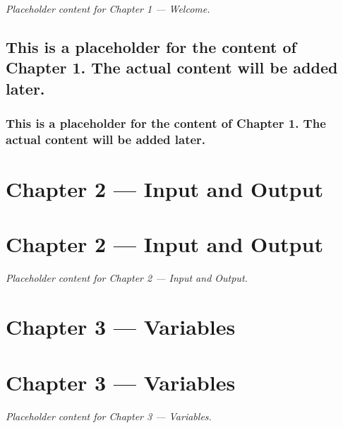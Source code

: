 \documentclass[
  letterpaper,
  DIV=11,
  numbers=noendperiod]{scrreprt}
\begin{document}

\emph{Placeholder content for Chapter 1 --- Welcome.}

\section{This is a placeholder for the content of Chapter 1. The actual
content will be added
later.}\label{this-is-a-placeholder-for-the-content-of-chapter-1.-the-actual-content-will-be-added-later.}

\subsection{This is a placeholder for the content of Chapter 1. The
actual content will be added
later.}\label{this-is-a-placeholder-for-the-content-of-chapter-1.-the-actual-content-will-be-added-later.-1}

\chapter{Chapter 2 --- Input and
Output}\label{chapter-2-input-and-output}

\chapter*{Chapter 2 --- Input and
Output}\label{chapter-2-input-and-output-1}


\emph{Placeholder content for Chapter 2 --- Input and Output.}

\chapter{Chapter 3 --- Variables}\label{chapter-3-variables}

\chapter*{Chapter 3 --- Variables}\label{chapter-3-variables-1}


\emph{Placeholder content for Chapter 3 --- Variables.}
\end{document}
